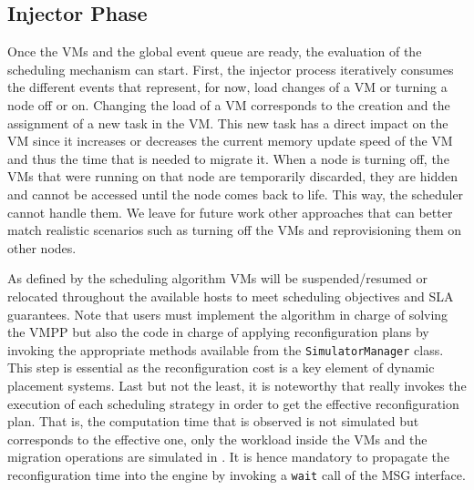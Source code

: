 \subsection{Injector Phase}

Once the VMs and the global event queue are ready, the evaluation of
the scheduling mechanism can start. First, the injector process
iteratively consumes the different events that represent, for now,
load changes of a VM or turning a node off or on.  Changing the load
of a VM corresponds to the creation and the assignment of a new \sg
task in the VM. This new task has a direct impact on the VM since it
increases or decreases the current memory update speed of the VM and
thus the time that is needed to migrate it. 
When a node is turning off, the VMs that were running on that node are
temporarily discarded, \ie they are hidden and cannot be accessed
until the node comes back to life. This way, the scheduler cannot
handle them.   We leave for future work other approaches that can better
match realistic scenarios such as turning off the VMs and
reprovisioning them on other nodes.
%

As defined by the scheduling algorithm VMs will be suspended/resumed
or relocated throughout the available hosts to meet scheduling
objectives and SLA guarantees.  Note that users must implement the
algorithm in charge of solving the VMPP but also the code in charge of
applying reconfiguration plans by invoking the appropriate methods
available from the \texttt{SimulatorManager} class. This step is
essential as the reconfiguration cost is a key element of dynamic
placement systems.    Last but not the least, it is noteworthy
that \vmps really invokes the execution of each scheduling strategy in
order to get the effective reconfiguration plan.  That is, the
computation time that is observed is not simulated but corresponds to
the effective one, only the workload inside the VMs and the migration
operations are simulated in \sg. It is hence mandatory to propagate
the reconfiguration time into the \sg engine by invoking a
\texttt{wait} call of the MSG interface.

